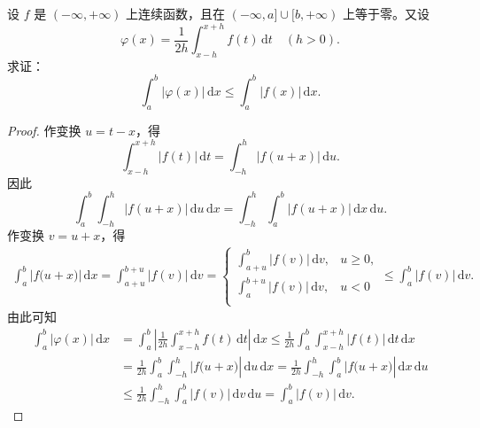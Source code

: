 \documentclass[../../main.tex]{subfiles}%
\begin{document}
\begin{example}
设 \( f \) 是 \( (-\infty,+\infty) \) 上连续函数，且在 \( (-\infty,a] \cup [b,+\infty) \) 上等于零。又设
\[
\varphi(x) = \frac{1}{2h} \int_{x-h}^{x+h} f(t) \, \mathrm{d}t \quad (h > 0).
\]
求证：
\[
\int_{a}^{b} |\varphi(x)| \, \mathrm{d}x \leqslant \int_{a}^{b} |f(x)| \, \mathrm{d}x.
\]
\end{example}
\begin{proof}
作变换 \( u = t - x \)，得
\[
\int_{x-h}^{x+h} |f(t)| \, \mathrm{d}t = \int_{-h}^{h} |f(u + x)| \, \mathrm{d}u.
\]
因此
\[
\int_{a}^{b} \int_{-h}^{h} |f(u + x)| \, \mathrm{d}u \, \mathrm{d}x = \int_{-h}^{h} \int_{a}^{b} |f(u + x)| \, \mathrm{d}x \, \mathrm{d}u.
\]
作变换 \( v = u + x \)，得
\begin{align*}
\int_a^b{|f(u}+x)|\,\mathrm{d}x=\int_{a+u}^{b+u}{|f(v)|\,\mathrm{d}v}=\begin{cases}
\int_{a+u}^b{|f(v)|\,\mathrm{d}v,}&		u\geqslant 0,\\
\int_a^{b+u}{|f(v)|\,\mathrm{d}v,}&		u<0\\
\end{cases}\leqslant \int_a^b{|f(v)|\,\mathrm{d}v}.
\end{align*}
由此可知
\begin{align*}
\int_a^b{|\varphi (x)|\,\mathrm{d}x}&=\int_a^b{\left| \frac{1}{2h}\int_{x-h}^{x+h}{f(t)\,\mathrm{d}t} \right|\,\mathrm{d}x}\leqslant \frac{1}{2h}\int_a^b{\int_{x-h}^{x+h}{|f(t)|\,\mathrm{d}t\,\mathrm{d}x}}
\\
&=\frac{1}{2h}\int_a^b{\int_{-h}^h{|f(u}}+x)|\,\mathrm{d}u\,\mathrm{d}x=\frac{1}{2h}\int_{-h}^h{\int_a^b{|f(u}}+x)|\,\mathrm{d}x\,\mathrm{d}u
\\
&\leqslant \frac{1}{2h}\int_{-h}^h{\int_a^b{|f(v)|\,\mathrm{d}v\,\mathrm{d}u}}=\int_a^b{|f(v)|\,\mathrm{d}v}.
\end{align*}
\end{proof}
\end{document}
